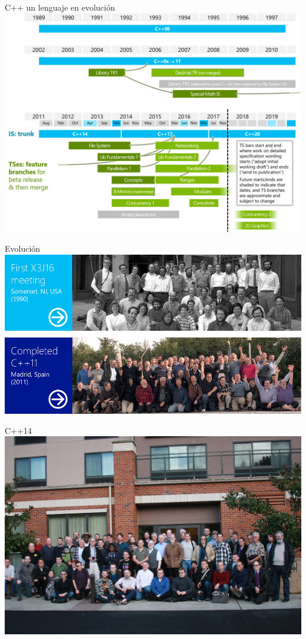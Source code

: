\begin{frame}[t]{C++ un lenguaje en evolución}
\includegraphics[width=\textwidth]{../img/wg21-timeline.png}
\end{frame}

\begin{frame}[t]{Evolución}
\includegraphics[width=\textwidth]{../img/wg21-1990-2011.png}
\end{frame}

\begin{frame}[t]{C++14}
\includegraphics[width=\textwidth]{../img/cpp-14.jpg}
\end{frame}

